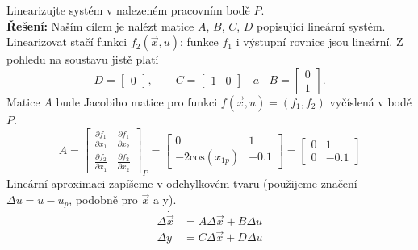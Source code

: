 \documentclass[twoside]{article}
\begin{document}
\subsection{~}
Linearizujte systém v nalezeném pracovním bodě $P$.\\
\textbf{Řešení:} Naším cílem je nalézt matice $A$, $B$, $C$, $D$ popisující lineární systém. Linearizovat stačí funkci $f_2(\vec{x}, u)$; funkce $f_1$ i výstupní
rovnice jsou lineární. Z pohledu na soustavu jistě platí
\begin{equation*}
	D = \begin{bmatrix}
		0
	\end{bmatrix}, ~~~~~~~~~ C = \begin{bmatrix}
		1 & 0
	\end{bmatrix} ~~~~a~~~~ B = \begin{bmatrix}
		0 \\ 1
	\end{bmatrix}.
\end{equation*}
Matice $A$ bude Jacobiho matice pro funkci $f(\vec{x}, u) = (f_1, f_2)$ vyčíslená v bodě $P$.
\begin{equation*}
	A = \begin{bmatrix}
		\frac{\partial f_1}{\partial x_1} & \frac{\partial f_1}{\partial x_2} \\ 
		\frac{\partial f_2}{\partial x_1} & \frac{\partial f_2}{\partial x_2}
	\end{bmatrix}_P = \begin{bmatrix}
		0 & 1 \\
		-2\text{cos}(x_{1p}) & -0.1
	\end{bmatrix} = \begin{bmatrix}
		0 & 1 \\
		0 & -0.1
	\end{bmatrix}
\end{equation*}
Lineární aproximaci zapíšeme v odchylkovém tvaru (použijeme značení $\Delta u = u - u_p$, podobně pro $\vec{x}$ a y).
\begin{equation*}
	\begin{split}
		\Delta \dot{\vec{x}} &= A \Delta\vec{x} + B \Delta u \\
		\Delta y &= C \Delta\vec{x} + D \Delta u
	\end{split}
\end{equation*}

\
\end{document}
